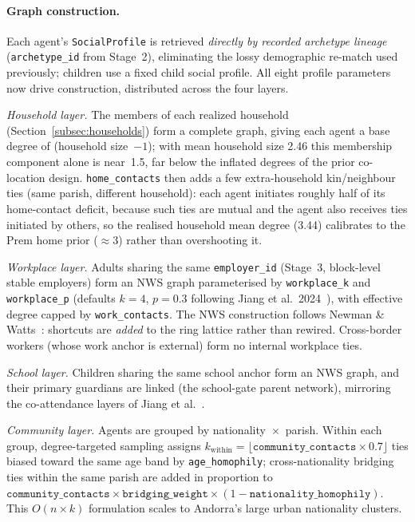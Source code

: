 \documentclass[a4paper,12pt]{article}
\begin{document}
\paragraph{Graph construction.}
Each agent's \texttt{SocialProfile} is retrieved \emph{directly by recorded
archetype lineage} (\texttt{archetype\_id} from Stage~2), eliminating the lossy
demographic re-match used previously; children use a fixed child social profile. All
eight profile parameters now drive construction, distributed across the four layers.

\emph{Household layer.} The members of each realized household
(Section~\ref{subsec:households}) form a complete graph, giving each agent a base
degree of (household size~$-1$); with mean household size 2.46 this membership
component alone is near~1.5, far below the inflated degrees of the prior co-location
design. \texttt{home\_contacts} then adds a few extra-household kin/neighbour ties
(same parish, different household): each agent initiates roughly half of its
home-contact deficit, because such ties are mutual and the agent also receives ties
initiated by others, so the realised household mean degree (3.44) calibrates to the
Prem home prior ($\approx$3) rather than overshooting it.

\emph{Workplace layer.} Adults sharing the same \texttt{employer\_id} (Stage~3,
block-level stable employers) form an NWS graph parameterised by \texttt{workplace\_k}
and \texttt{workplace\_p} (defaults $k=4$, $p=0.3$ following Jiang et
al.~2024~\cite{jiang2024large}), with effective degree capped by \texttt{work\_contacts}.
The NWS construction follows Newman \& Watts~\cite{newman1999renormalization}:
shortcuts are \emph{added} to the ring lattice rather than rewired. Cross-border
workers (whose work anchor is external) form no internal workplace ties.

\emph{School layer.} Children sharing the same school anchor form an NWS graph, and
their primary guardians are linked (the school-gate parent network), mirroring the
co-attendance layers of Jiang et al.~\cite{jiang2022synthetic}.

\emph{Community layer.} Agents are grouped by nationality~$\times$~parish. Within each
group, degree-targeted sampling assigns
$k_\text{within} = \lfloor\texttt{community\_contacts} \times 0.7\rfloor$ ties biased
toward the same age band by \texttt{age\_homophily}; cross-nationality bridging ties
within the same parish are added in proportion to
$\texttt{community\_contacts}\times\texttt{bridging\_weight}\times(1-\texttt{nationality\_homophily})$.
This $O(n \times k)$ formulation scales to Andorra's large urban nationality clusters.
\end{document}
